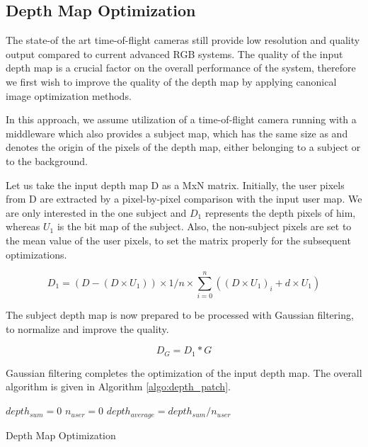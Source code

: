 \documentclass[twocolumn]{svjour3}          %
\begin{document}
\subsection{Depth Map Optimization}
\label{subsec:3.1} 
The state-of the art time-of-flight cameras still provide low resolution and quality output compared to current advanced RGB systems. The quality of the input depth map is a crucial factor
on the overall performance of the system, therefore we first wish to improve the quality of the depth map by applying canonical image optimization methods.

In this approach, we assume utilization of a time-of-flight camera running with a middleware which also provides a subject map, which has the same size as and denotes the origin of the pixels of the depth map, either belonging to a subject or to the background.

Let us take the input depth map D as a MxN matrix. Initially, the user pixels from D are
extracted by a pixel-by-pixel comparison with the input user map. We are only interested in the one subject and $D_1$ represents the depth pixels
of him, whereas $U_1$ is the bit map of the subject.
Also, the non-subject pixels are set to the mean value of the user pixels, to set the matrix properly for the subsequent optimizations.

\begin{equation}
D_1=(D-(D \times U_1 )) \times 1/n \times \sum\limits_{i=0}^n ((D \times U_1 )_i + d \times U_1 )
\label{eqn:patch_depth}
\end{equation}

The subject depth map is now prepared to be processed with Gaussian filtering, to normalize and
improve the quality. 

\begin{equation}
D_G=D_1*G
\label{eqn:gaussian_convolution}
\end{equation}

Gaussian filtering completes the optimization of the input depth map. The overall algorithm is given in Algorithm \ref{algo:depth_patch}.

\begin{algorithm}
\dontprintsemicolon %
$depth_{sum}=0$ \;
$n_{user} =0$\;
$depth_{average}=depth_{sum}/n_{user}$ \;
 
\caption{Depth Map Optimization}
\label{algo:depth_patch}
\end{algorithm}
\end{document}
